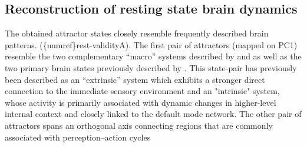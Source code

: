 \documentclass{article}
\begin{document}
\subsection{Reconstruction of resting state brain dynamics}\label{Reconstruction of resting state brain dynamics}

The obtained attractor states closely resemble frequently described brain patterns. (\{numref\}rest-validityA). The first pair of attractors (mapped on PC1) resemble the two complementary ``macro'' systems described by and as well as the two primary brain states previously described by . This state-pair has previously been described as an ``extrinsic'' system which exhibits a stronger direct connection to the immediate sensory environment and an "intrinsic" system, whose activity is primarily associated with dynamic changes in higher-level internal context and closely linked to the default mode network. The other pair of attractors spans an orthogonal axis connecting regions that are commonly associated with perception--action cycles
\end{document}
